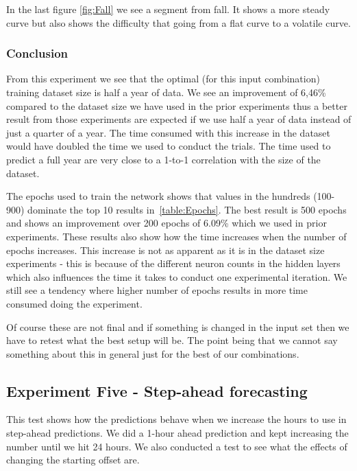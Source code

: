 In the last figure \ref{fig:Fall} we see a segment from fall. It shows a more steady curve but also shows the difficulty that going from a flat curve to a volatile curve.

\subsubsection{Conclusion}
From this experiment we see that the optimal (for this input combination) training dataset size is half a year of data. We see an improvement of 6,46\% compared to the dataset size we have used in the prior experiments thus a better result from those experiments are expected if we use half a year of data instead of just a quarter of a year. The time consumed with this increase in the dataset would have doubled the time we used to conduct the trials. The time used to predict a full year are very close to a 1-to-1 correlation with the size of the dataset. 

The epochs used to train the network shows that values in the hundreds (100-900) dominate the top 10 results in~\ref{table:Epochs}. The best result is 500 epochs and shows an improvement over 200 epochs of 6.09\% which we used in prior experiments. These results also show how the time increases when the number of epochs increases. This increase is not as apparent as it is in the dataset size experiments - this is because of the different neuron counts in the hidden layers which also influences the time it takes to conduct one experimental iteration. We still see a tendency where higher number of epochs results in more time consumed doing the experiment.

Of course these are not final and if something is changed in the input set then we have to retest what the best setup will be. The point being that we cannot say something about this in general just for the best of our combinations.

\newpage
\subsection{Experiment Five - Step-ahead forecasting}
\label{sec:priceExperimentFive}
This test shows how the predictions behave when we increase the hours to use in step-ahead predictions. We did a 1-hour ahead prediction and kept increasing the number until we hit 24 hours. We also conducted a test to see what the effects of changing the starting offset are.

